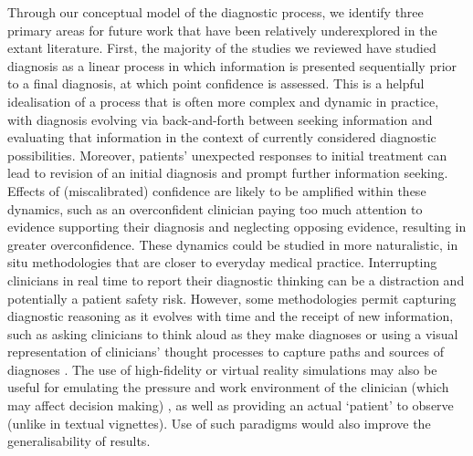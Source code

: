 \documentclass[a4paper, nobind]{templates/ociamthesis}
\begin{document}
\hfill\break
Through our conceptual model of the diagnostic process, we identify three primary areas for future work that have been relatively underexplored in the extant literature. First, the majority of the studies we reviewed have studied diagnosis as a linear process in which information is presented sequentially prior to a final diagnosis, at which point confidence is assessed. This is a helpful idealisation of a process that is often more complex and dynamic in practice, with diagnosis evolving via back-and-forth between seeking information and evaluating that information in the context of currently considered diagnostic possibilities. Moreover, patients' unexpected responses to initial treatment can lead to revision of an initial diagnosis and prompt further information seeking. Effects of (miscalibrated) confidence are likely to be amplified within these dynamics, such as an overconfident clinician paying too much attention to evidence supporting their diagnosis and neglecting opposing evidence, resulting in greater overconfidence. These dynamics could be studied in more naturalistic, in situ methodologies that are closer to everyday medical practice. Interrupting clinicians in real time to report their diagnostic thinking can be a distraction and potentially a patient safety risk. However, some methodologies permit capturing diagnostic reasoning as it evolves with time and the receipt of new information, such as asking clinicians to think aloud as they make diagnoses \autocite{arocha_novice_1995,coderre_diagnostic_2003} or using a visual representation of clinicians' thought processes to capture paths and sources of diagnoses \autocite{feyzi-behnagh_metacognitive_2014}. The use of high-fidelity or virtual reality simulations may also be useful for emulating the pressure and work environment of the clinician (which may affect decision making) \autocite{schmidt_simulation_2013,jans_examining_2023}, as well as providing an actual `patient' to observe (unlike in textual vignettes). Use of such paradigms would also improve the generalisability of results.
\end{document}
